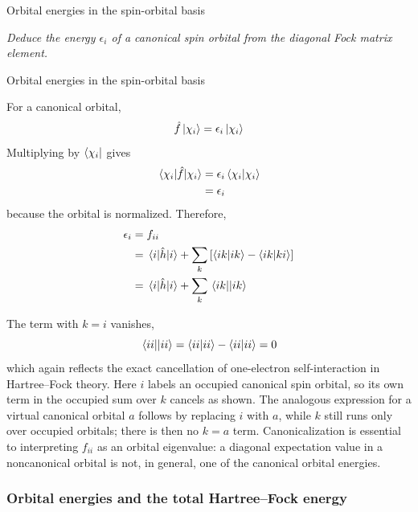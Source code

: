 \documentclass[11pt,a4paper,titlepage]{article}
\numberwithin{equation}{section}
\newcommand{\hh}{\Hat{h}}
\newcommand{\hf}{\Hat{f}}
\newcommand{\violet}[1]{\textcolor{hfViolet}{#1}}
\begin{document}
\begin{hfexercise}{Orbital energies in the spin-orbital basis}

\violet{\textit{Deduce the energy $\epsilon_i$ of a canonical spin
orbital from the diagonal Fock matrix element.}}

\end{hfexercise}
\begin{hfsolution}{Orbital energies in the spin-orbital basis}

For a canonical orbital,
\begin{equation}
  \hf\ket{\chi_i}
  =
  \epsilon_i\ket{\chi_i}
\end{equation}
Multiplying by $\bra{\chi_i}$ gives
\begin{equation}
\begin{split}
  \mel{\chi_i}{\hf}{\chi_i}
  &=
  \epsilon_i
  \braket{\chi_i}{\chi_i}
  \\
  &=
  \epsilon_i
\end{split}
\end{equation}
because the orbital is normalized. Therefore,
\begin{equation}
\begin{split}
  \epsilon_i
  &=
  f_{ii}
  \\
  &=
  \mel{i}{\hh}{i}
  +
  \sum_k
  \qty[
    \braket{ik}{ik}
    -
    \braket{ik}{ki}
  ]
  \\
  &=
  \mel{i}{\hh}{i}
  +
  \sum_k
  \mel{ik}{}{ik}
  \label{eq:hf-orbital-energy}
\end{split}
\end{equation}

The term with $k=i$ vanishes,
\begin{equation}
  \mel{ii}{}{ii}
  =
  \braket{ii}{ii}
  -
  \braket{ii}{ii}
  =
  0
\end{equation}
which again reflects the exact cancellation of one-electron
self-interaction in Hartree--Fock theory.
Here $i$ labels an occupied canonical spin orbital, so its own term in the
occupied sum over $k$ cancels as shown. The analogous expression for a
virtual canonical orbital $a$ follows by replacing $i$ with $a$, while
$k$ still runs only over occupied orbitals; there is then no $k=a$ term.
Canonicalization is
essential to interpreting $f_{ii}$ as an orbital eigenvalue: a diagonal
expectation value in a noncanonical orbital is not, in general, one of the
canonical orbital energies.


\end{hfsolution}
\subsubsection{Orbital energies and the total Hartree--Fock energy}
\end{document}
